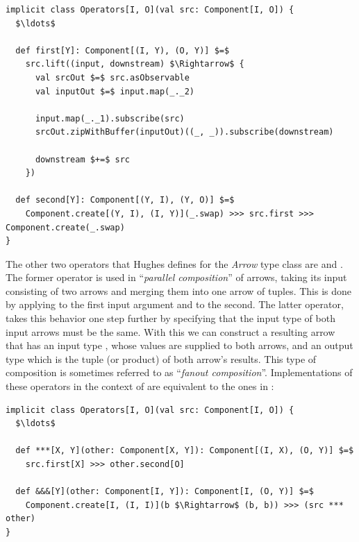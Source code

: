 \begin{minipage}{\linewidth}
\begin{lstlisting}[style=ScalaStyle, caption={Implementations of the \textit{Arrow}'s \code{first} and \code{second} operators}, label={lst:first-and-second}]
implicit class Operators[I, O](val src: Component[I, O]) {
  $\ldots$

  def first[Y]: Component[(I, Y), (O, Y)] $=$
    src.lift((input, downstream) $\Rightarrow$ {
      val srcOut $=$ src.asObservable
      val inputOut $=$ input.map(_._2)

      input.map(_._1).subscribe(src)
      srcOut.zipWithBuffer(inputOut)((_, _)).subscribe(downstream)

      downstream $+=$ src
    })

  def second[Y]: Component[(Y, I), (Y, O)] $=$
    Component.create[(Y, I), (I, Y)](_.swap) >>> src.first >>> Component.create(_.swap)
}
\end{lstlisting}
\end{minipage}

The other two operators that Hughes defines for the \textit{Arrow} type class are \code{(***)} and \code{(\&\&\&)}. The former operator is used in ``\textit{parallel composition}'' of arrows, taking its input consisting of two arrows and merging them into one arrow of tuples. This is done by applying  to the first input argument and  to the second. The latter operator, takes this behavior one step further by specifying that the input type of both input arrows must be the same. With this we can construct a resulting arrow that has an input type , whose values are supplied to both arrows, and an output type which is the tuple (or product) of both arrow's results. This type of composition is sometimes referred to as ``\textit{fanout composition}''. Implementations of these operators in the context of \comp are equivalent to the ones in :

\begin{minipage}{\linewidth}
\begin{lstlisting}[style=ScalaStyle, caption={Implementations of the \textit{Arrow}'s \code{(***)} and \code{(\&\&\&)} operators}, label={lst:parallel-and-fanout}]
implicit class Operators[I, O](val src: Component[I, O]) {
  $\ldots$

  def ***[X, Y](other: Component[X, Y]): Component[(I, X), (O, Y)] $=$
    src.first[X] >>> other.second[O]

  def &&&[Y](other: Component[I, Y]): Component[I, (O, Y)] $=$
    Component.create[I, (I, I)](b $\Rightarrow$ (b, b)) >>> (src *** other)
}
\end{lstlisting}
\end{minipage}

